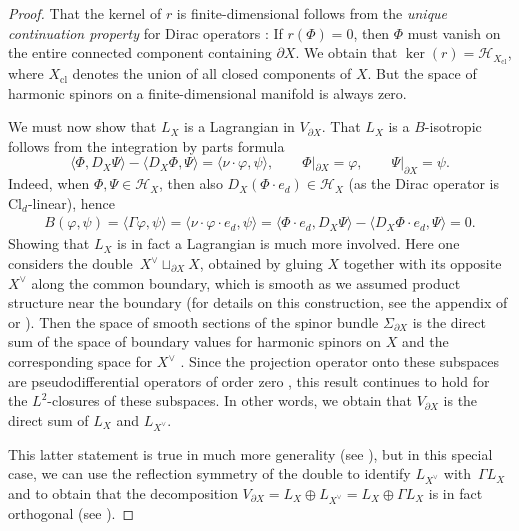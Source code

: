 \documentclass[10pt,a4paper]{amsart}
\numberwithin{equation}{section}
\newcommand{\Cl}{\mathrm{Cl}}
\begin{document}
\begin{proof}
That the kernel of $r$ is finite-dimensional follows from the \emph{unique continuation property} for Dirac operators \cite[Section~8]{BBW}: If $r(\Phi) = 0$, then $\Phi$ must vanish on the entire connected component containing $\partial X$.
We obtain that $ \ker(r) = \mathcal{H}_{X_{\mathrm{cl}}}$,
where $X_{\mathrm{cl}}$ denotes the union of all closed components of $X$.
But the space of harmonic spinors on a finite-dimensional manifold is always zero.

We must now show that $L_X$ is a Lagrangian in $V_{\partial X}$.
That $L_X$ is a $B$-isotropic follows from the integration by parts formula \cite[Theorem~3.2\,(5)]{BaerBallmannGuide}
\begin{equation*}
 \langle \Phi, D_X \Psi \rangle - \langle D_X \Phi, \Psi\rangle = \langle \nu \cdot \varphi,\psi\rangle, \qquad \Phi|_{\partial X} = \varphi,\qquad \Psi|_{\partial X} = \psi.
\end{equation*}
Indeed, when $\Phi, \Psi \in \mathcal{H}_X$, then also $D_X(\Phi \cdot e_d) \in \mathcal{H}_X$ (as the Dirac operator is $\Cl_d$-linear), hence
\begin{align*}
B(\varphi, \psi) = \langle \Gamma \varphi, \psi\rangle = \langle \nu \cdot \varphi \cdot e_d, \psi\rangle = \langle \Phi \cdot e_d, D_X \Psi \rangle - \langle D_X \Phi\cdot e_d, \Psi\rangle= 0.
\end{align*}
Showing that $L_X$ is in fact a Lagrangian is much more involved.
Here one considers the double~${X^\vee \sqcup_{\partial X} X}$, obtained by gluing $X$ together with its opposite $X^\vee$ along the common boundary, which is smooth as we assumed product structure near the boundary (for details on this construction, see the appendix of \cite{AmmannDahlHumbert} or \cite[Section~9]{BBW}).
Then the space of smooth sections of the spinor bundle $\Sigma_{\partial X}$ is the direct sum of the space of boundary values for harmonic spinors on $X$ and the corresponding space for $X^\vee$ \cite[Lemma 12.3]{BBW}.
Since the projection operator onto these subspaces are pseudodifferential operators of order zero \cite[Theorem~12.4]{BBW}, this result continues to hold for the $L^2$-closures of these subspaces.
In other words, we obtain that $V_{\partial X}$ is the direct sum of $L_X$ and $L_{X^\vee}$.

This latter statement is true in much more generality (see \cite[Section~XVII, Lemma B]{PalaisAtiyahSinger}), but in this special case, we can use the reflection symmetry of the double to identify $L_{X^\vee}$ with~$\Gamma L_X$ and to obtain that the decomposition $V_{\partial X} = L_X \oplus L_{X^\vee} = L_X \oplus \Gamma L_X$ is in fact orthogonal (see \cite[Theorem~3.12]{LudewigRoos}).
\end{proof}
\end{document}
